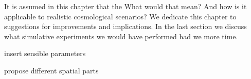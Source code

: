 













It is assumed in this chapter that the  What would that mean? And how is it applicable to realistic cosmological scenarios? We dedicate this chapter to suggestions for improvements and implications. In the last section we discuss what simulative experiments we would have performed had we more time.




\begin{bullets}
    \item insert sensible parameters
    \item propose different spatial parts 
\end{bullets}














    
